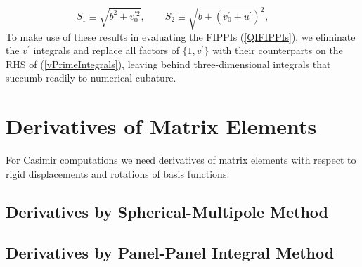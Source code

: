 \documentclass[letterpaper]{article}
\begin{document}
$$ S_1\equiv\sqrt{b^2 + v_0^{\prime 2}}, 
   \qquad
   S_2\equiv\sqrt{b + (v_0^{\prime} + u^\prime)^2}, \qquad
$$
To make use of these results in evaluating the FIPPIs 
(\ref{QIFIPPIs}), we eliminate the $v^\prime$ integrals
and replace all factors of $\{1, v^\prime\}$ with
their counterparts on the RHS of (\ref{vPrimeIntegrals}),
leaving behind three-dimensional integrals that succumb
readily to numerical cubature.

\newpage
\section{Derivatives of Matrix Elements}

For Casimir computations we need derivatives of matrix elements
with respect to rigid displacements and rotations of basis functions.

\subsection{Derivatives by Spherical-Multipole Method}

\subsection{Derivatives by Panel-Panel Integral Method}
\end{document}
